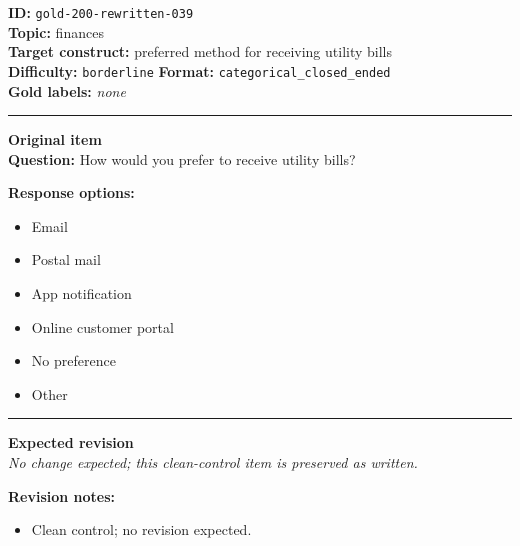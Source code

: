 \documentclass[10pt,a4paper]{article}
\newcommand{\sectionline}{\vspace{0.15em}\hrule\vspace{0.35em}}
\begin{document}
\begin{tcolorbox}[colframe=CleanGreen,colback=white,colbacktitle=CleanGreen!9,coltitle=black,title={Item 039\hfill Clean control}]
\textbf{ID:} \texttt{gold-200-rewritten-039}\\
\textbf{Topic:} finances\\
\textbf{Target construct:} preferred method for receiving utility bills\\
\textbf{Difficulty:} \texttt{borderline} \quad \textbf{Format:} \texttt{categorical\_closed\_ended}\\
\textbf{Gold labels:} \textit{none}\\
\sectionline
\textbf{Original item}\\
\textbf{Question:} How would you prefer to receive utility bills?
\par\textbf{Response options:}
\begin{itemize}
\item Email
\item Postal mail
\item App notification
\item Online customer portal
\item No preference
\item Other
\end{itemize}
\sectionline
\textbf{Expected revision}\\
\textit{No change expected; this clean-control item is preserved as written.}
\par\textbf{Revision notes:}
\begin{itemize}
\item Clean control; no revision expected.
\end{itemize}
\end{tcolorbox}
\end{document}
